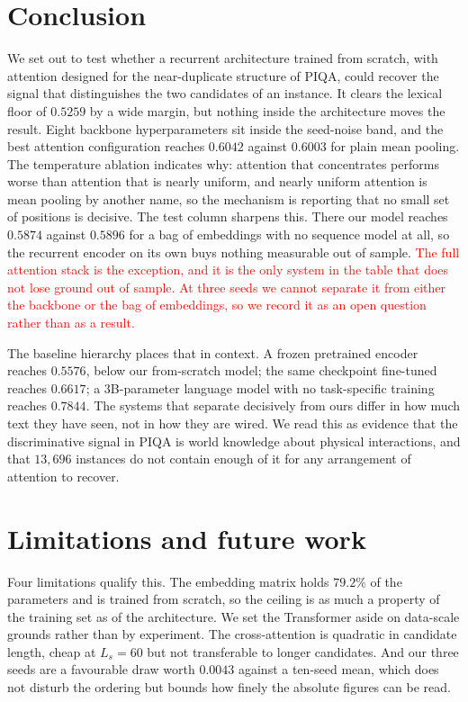 \documentclass[11pt]{article}
\begin{document}
\section{Conclusion}

We set out to test whether a recurrent architecture trained from scratch, with attention designed for the near-duplicate structure of PIQA, could recover the signal that distinguishes the two candidates of an instance. It clears the lexical floor of $0.5259$ by a wide margin, but nothing inside the architecture moves the result. Eight backbone hyperparameters sit inside the seed-noise band, and the best attention configuration reaches $0.6042$ against $0.6003$ for plain mean pooling. The temperature ablation indicates why: attention that concentrates performs worse than attention that is nearly uniform, and nearly uniform attention is mean pooling by another name, so the mechanism is reporting that no small set of positions is decisive. The test column sharpens this. There our model reaches $0.5874$ against $0.5896$ for a bag of embeddings with no sequence model at all, so the recurrent encoder on its own buys nothing measurable out of sample. \textcolor{red}{The full attention stack is the exception, and it is the only system in the table that does not lose ground out of sample. At three seeds we cannot separate it from either the backbone or the bag of embeddings, so we record it as an open question rather than as a result.}

The baseline hierarchy places that in context. A frozen pretrained encoder reaches $0.5576$, below our from-scratch model; the same checkpoint fine-tuned reaches $0.6617$; a 3B-parameter language model with no task-specific training reaches $0.7844$. The systems that separate decisively from ours differ in how much text they have seen, not in how they are wired. We read this as evidence that the discriminative signal in PIQA is world knowledge about physical interactions, and that $13,696$ instances do not contain enough of it for any arrangement of attention to recover.

\section{Limitations and future work}

Four limitations qualify this. The embedding matrix holds $79.2\%$ of the parameters and is trained from scratch, so the ceiling is as much a property of the training set as of the architecture. We set the Transformer aside on data-scale grounds rather than by experiment. The cross-attention is quadratic in candidate length, cheap at ${L}_{s}=60$ but not transferable to longer candidates. And our three seeds are a favourable draw worth $0.0043$ against a ten-seed mean, which does not disturb the ordering but bounds how finely the absolute figures can be read.
\end{document}
